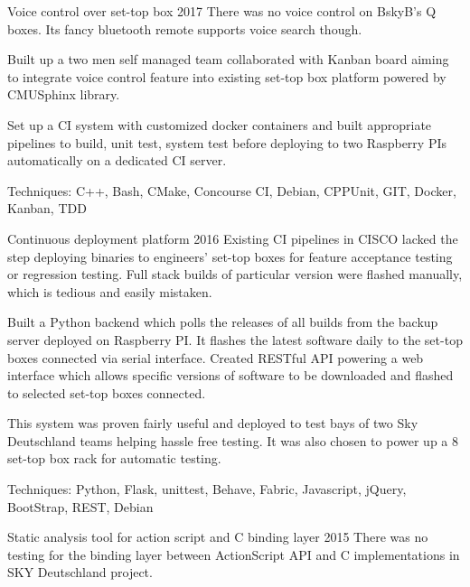 \begin{cventries}
  \cventryX
    {Voice control over set-top box}
    {2017}
    {There was no voice control on BskyB's Q boxes. Its fancy bluetooth remote supports voice search though.}
    {
      \begin{cvitems}
        \item {Built up a two men self managed team collaborated with Kanban board aiming to integrate voice control feature into existing set-top box platform powered by CMUSphinx library.}
        \item {Set up a CI system with customized docker containers and built appropriate pipelines to build, unit test, system test before deploying to two Raspberry PIs automatically on a dedicated CI server.}
        \item{Techniques: C++, Bash, CMake, Concourse CI, Debian, CPPUnit, GIT, Docker, Kanban, TDD}
      \end{cvitems}
    }
  \cventryX
    {Continuous deployment platform}
    {2016}
    {Existing CI pipelines in CISCO lacked the step deploying binaries to engineers' set-top boxes for feature acceptance testing or regression testing. Full stack builds of particular version were flashed manually, which is tedious and easily mistaken.}
    {
      \begin{cvitems}
        \item {Built a Python backend which polls the releases of all builds from the backup server deployed on Raspberry PI. It flashes the latest software daily to the set-top boxes connected via serial interface. Created RESTful API powering a web interface which allows specific versions of software to be downloaded and flashed to selected set-top boxes connected.}
        \item{This system was proven fairly useful and deployed to test bays of two Sky Deutschland teams helping hassle free testing. It was also chosen to power up a 8 set-top box rack for automatic testing.}
        \item{Techniques: Python, Flask, unittest, Behave, Fabric, Javascript, jQuery, BootStrap, REST, Debian}
      \end{cvitems}
    }
  \cventryX
    {Static analysis tool for action script and C binding layer}
    {2015}
    {There was no testing for the binding layer between ActionScript API and C implementations in SKY Deutschland project.}

\end{cventries}

